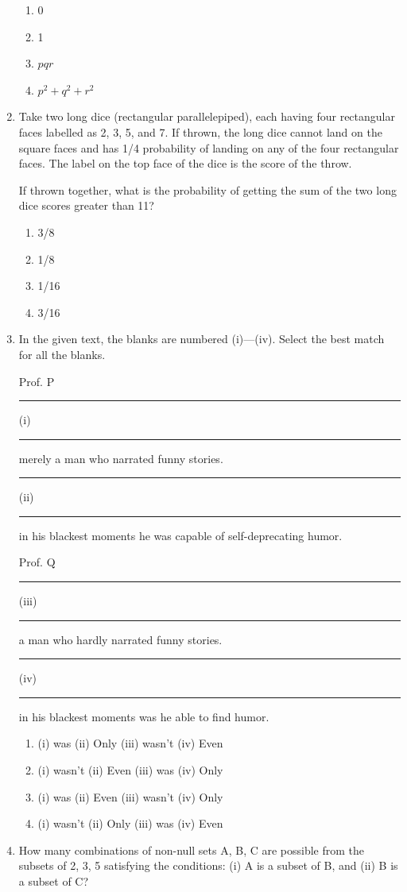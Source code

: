 \documentclass[12pt]{article}
\begin{document}
\begin{enumerate}
\begin{enumerate}
    \item0  
   \item 1  
   \item $pqr$  
   \item $p^2 + q^2 + r^2$   
 
\end{enumerate}

\item Take two long dice (rectangular parallelepiped), each having four rectangular faces
labelled as 2, 3, 5, and 7. If thrown, the long dice cannot land on the square faces
and has 1/4 probability of landing on any of the four rectangular faces. The label on
the top face of the dice is the score of the throw.

If thrown together, what is the probability of getting the sum of the two long dice
scores greater than 11? 

\begin{enumerate}
    \item3/8 
   \item 1/8 
   \item 1/16  
   \item 3/16
\end{enumerate}

\item In the given text, the blanks are numbered (i)---(iv). Select the best match for all the
blanks.

Prof. P \rule{0.5cm}{0.15mm}(i)\rule{0.5cm}{0.15mm} merely a man who narrated funny stories. \rule{0.5cm}{0.15mm}(ii)\rule{0.5cm}{0.15mm} in his blackest moments he was capable of self-deprecating humor.

Prof. Q \rule{0.5cm}{0.15mm}(iii)\rule{0.5cm}{0.15mm} a man who hardly narrated funny stories. \rule{0.5cm}{0.15mm}(iv)\rule{0.5cm}{0.15mm} in his blackest moments was he able to find humor.

\begin{enumerate}
   

\item (i) was (ii) Only (iii) wasn’t (iv) Even  
   \item (i) wasn't (ii) Even (iii) was (iv) Only 
   \item (i) was (ii) Even (iii) wasn't (iv) Only  
   \item (i) wasn't (ii) Only (iii) was (iv) Even 
    
\end{enumerate}

\item How many combinations of non-null sets A, B, C are possible from the subsets of
{2, 3, 5} satisfying the conditions: (i) A is a subset of B, and (ii) B is a subset of C?  


\end{enumerate}
\end{document}
